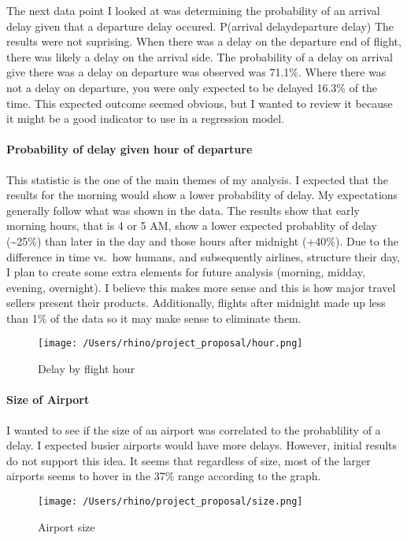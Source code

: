 \documentclass[]{article}
\let\oldparagraph\paragraph
\renewcommand{\paragraph}[1]{\oldparagraph{#1}\mbox{}}
\begin{document}
The next data point I looked at was determining the probability of an
arrival delay given that a departure delay occured. P(arrival
delay\textbar{}departure delay) The results were not suprising. When
there was a delay on the departure end of flight, there was likely a
delay on the arrival side. The probability of a delay on arrival give
there was a delay on departure was observed was 71.1\%. Where there was
not a delay on departure, you were only expected to be delayed 16.3\% of
the time. This expected outcome seemed obvious, but I wanted to review
it because it might be a good indicator to use in a regression model.

\paragraph{Probability of delay given hour of
departure}\label{probability-of-delay-given-hour-of-departure}

This statistic is the one of the main themes of my analysis. I expected
that the results for the morning would show a lower probability of
delay. My expectations generally follow what was shown in the data. The
results show that early morning hours, that is 4 or 5 AM, show a lower
expected probablity of delay (\textasciitilde{}25\%) than later in the
day and those hours after midnight (+40\%). Due to the difference in
time vs.~how humans, and subsequently airlines, structure their day, I
plan to create some extra elements for future analysis (morning, midday,
evening, overnight). I believe this makes more sense and this is how
major travel sellers present their products. Additionally, flights after
midnight made up less than 1\% of the data so it may make sense to
eliminate them.

\begin{figure}
\centering
\texttt{[image: /Users/rhino/project\_proposal/hour.png]}
\caption{Delay by flight hour}
\end{figure}

\paragraph{Size of Airport}\label{size-of-airport}

I wanted to see if the size of an airport was correlated to the
probablility of a delay. I expected busier airports would have more
delays. However, initial results do not support this idea. It seems that
regardless of size, most of the larger airports seems to hover in the
37\% range according to the graph.

\begin{figure}
\centering
\texttt{[image: /Users/rhino/project\_proposal/size.png]}
\caption{Airport size}
\end{figure}
\end{document}
